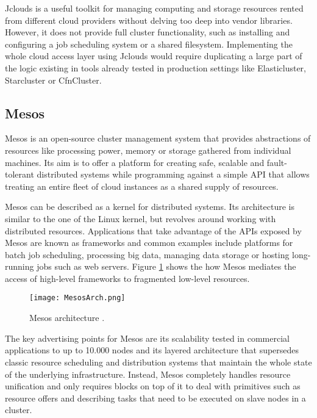 Jclouds is a useful toolkit for managing computing and storage resources rented from different cloud providers without delving too deep into vendor libraries. However, it does not provide full cluster functionality, such as installing and configuring a job scheduling system or a shared filesystem. Implementing the whole cloud access layer using Jclouds would require duplicating a large part of the logic existing in tools already tested in production settings like Elasticluster, Starcluster or CfnCluster.

\subsection{Mesos}

Mesos \cite{Mesos} is an open-source cluster management system that provides abstractions of resources like processing power, memory or storage gathered from individual machines. Its aim is to offer a platform for creating safe, scalable and fault-tolerant distributed systems while programming against a simple API that allows treating an entire fleet of cloud instances as a shared supply of resources.

Mesos can be described as a kernel for distributed systems. Its architecture is similar to the one of the Linux kernel, but revolves around working with distributed resources. Applications that take advantage of the APIs exposed by Mesos are known as frameworks and common examples include platforms for batch job scheduling, processing big data, managing data storage or hosting long-running jobs such as web servers. Figure \ref{MesosArch} shows the how Mesos mediates the access of high-level frameworks to fragmented low-level resources.

\begin{figure}[h]
	\centering
		\texttt{[image: MesosArch.png]}
	\caption{Mesos architecture \cite{MesosArch}.}
	\label{MesosArch}
\end{figure}

The key advertising points for Mesos are its scalability tested in commercial applications to up to 10.000 nodes and its layered architecture that supersedes classic resource scheduling and distribution systems that maintain the whole state of the underlying infrastructure. Instead, Mesos completely handles resource unification and only requires blocks on top of it to deal with primitives such as resource offers and describing tasks that need to be executed on slave nodes in a cluster.

